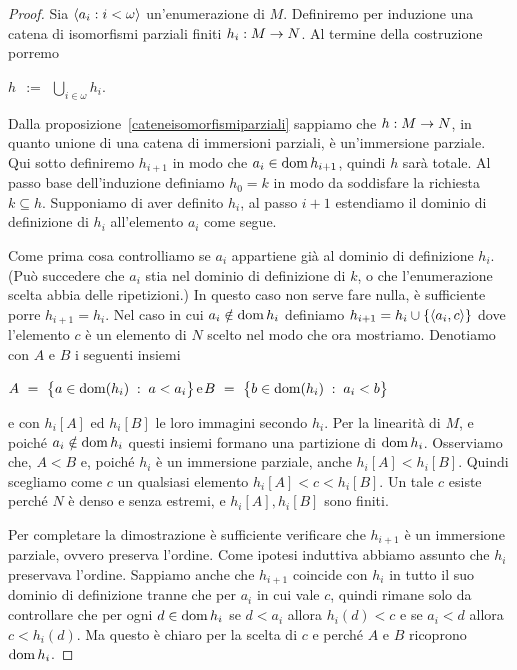 \begin{proof}
Sia $\langle a_i:i<\omega\rangle$ un'enumerazione di $M$. Definiremo per induzione una catena di isomorfismi parziali finiti $h_i:M\rightarrow N$. Al termine della costruzione porremo

\hfil$\displaystyle h\ \ :=\ \ \bigcup_{i\in\omega} h_i$.

Dalla proposizione~\ref{cateneisomorfismiparziali} sappiamo che $h:M\rightarrow N$, in quanto unione di una catena di immersioni parziali, \`e un'immersione parziale. Qui sotto definiremo $h_{i+1}$ in modo che $a_i\in\mathop{\rm dom} h_{i+1}$, quindi $h$ sar\`a totale. Al passo base dell'induzione definiamo $h_0=k$ in modo da soddisfare la richiesta $k\subseteq h$. Supponiamo di aver definito $h_i$, al passo $i+1$ estendiamo il dominio di definizione di $h_i$ all'elemento $a_i$ come segue.

Come prima cosa controlliamo se $a_i$ appartiene gi\`a al dominio di definizione $h_i$. (Pu\`o succedere che $a_i$ stia nel dominio di definizione di $k$, o che l'enumerazione scelta abbia delle ripetizioni.) In questo caso non serve fare nulla, \`e sufficiente porre $h_{i+1}=h_i$. Nel caso in cui $a_i\notin\mathop{\rm dom} h_i$ definiamo $h_{i+1}=h_i\cup\{\langle a_i,c\rangle\}$ dove l'elemento $c$ \`e un elemento di $N$ scelto nel modo che ora mostriamo. Denotiamo con $A$ e $B$ i seguenti insiemi

\hfil$A\displaystyle \ =\ \big\{a\in\dom(h_i)\;:\;a<a_i\big\}$\hfil e\hfil $B\ =\ \big\{b\in\dom(h_i)\;:\;a_i<b\big\}$

e con $h_i[A]$ ed $h_i[B]$ le loro immagini secondo $h_i$. Per la linearit\`a di $M$, e poich\'e $a_i\notin\mathop{\rm dom} h_i$ questi insiemi formano una partizione di $\mathop{\rm dom} h_i$. Osserviamo che, $A<B$ e, poich\'e $h_i$ \`e un immersione parziale, anche $h_i[A]<h_i[B]$. Quindi scegliamo come $c$ un qualsiasi elemento $h_i[A]<c<h_i[B]$. Un tale $c$ esiste perch\'e $N$ \`e denso e senza estremi, e $h_i[A],h_i[B]$ sono finiti.

Per completare la dimostrazione \`e sufficiente verificare che $h_{i+1}$ \`e un immersione parziale, ovvero preserva l'ordine. Come ipotesi induttiva abbiamo assunto che $h_i$ preservava l'ordine. Sappiamo anche che $h_{i+1}$ coincide con $h_i$ in tutto il suo dominio di definizione tranne che per $a_i$ in cui vale $c$, quindi rimane solo da controllare che per ogni $d\in\mathop{\rm dom} h_i$ se $d<a_i$ allora $h_i(d)<c$ e se $a_i<d$ allora $c<h_i(d)$. Ma questo \`e chiaro per la scelta di $c$ e perch\'e $A$ e $B$ ricoprono $\mathop{\rm dom} h_i$.
\end{proof}

